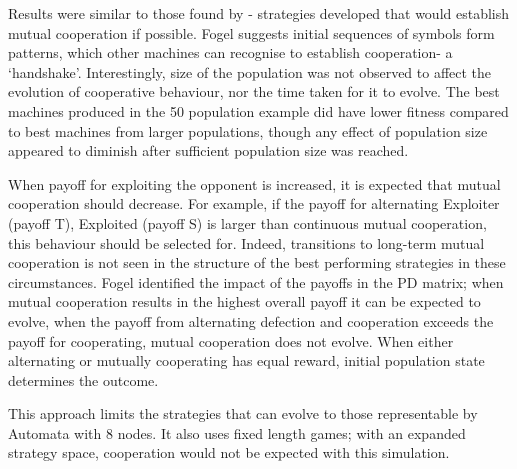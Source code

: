 \documentclass[a4paper,11pt]{article}
\begin{document}
Results were similar to those found by \citep{Axelrod1997}- strategies developed that would establish mutual cooperation if possible. Fogel suggests initial sequences of symbols form patterns, which other machines can recognise to establish cooperation- a `handshake'. 
Interestingly, size of the population was not observed to affect the evolution of cooperative behaviour, nor the time taken for it to evolve. The best machines produced in the 50 population example did have lower fitness compared to best machines from larger populations, though any effect of population size appeared to diminish after sufficient population size was reached. 

When payoff for exploiting the opponent is increased, it is expected that mutual cooperation should decrease. For example, if the payoff for alternating Exploiter (payoff T), Exploited (payoff S) is larger than continuous mutual cooperation, this behaviour should be selected for. Indeed, transitions to long-term mutual cooperation is not seen in the structure of the best performing strategies in these circumstances. Fogel identified the impact of the payoffs in the PD matrix; when mutual cooperation results in the highest overall payoff it can be expected to evolve, when the payoff from alternating defection and cooperation exceeds the payoff for cooperating, mutual cooperation does not evolve. When either alternating or mutually cooperating has equal reward, initial population state determines the outcome. 

This approach limits the strategies that can evolve to those representable by Automata with 8 nodes. 
It also uses fixed length games; with an expanded strategy space, cooperation would not be expected with this simulation.
%
%
\end{document}

